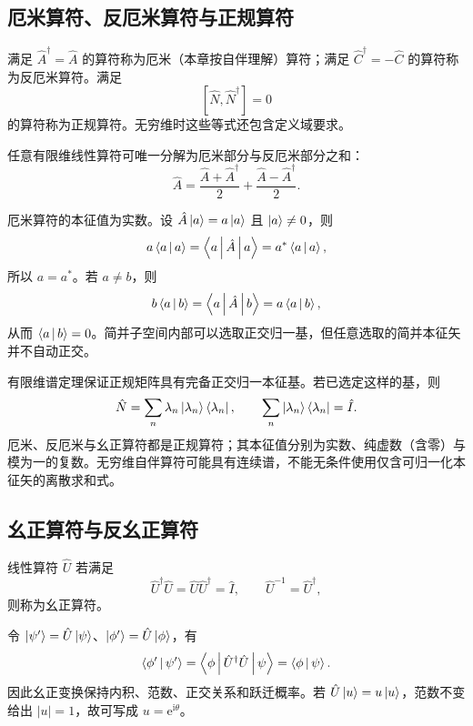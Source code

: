 \subsection{厄米算符、反厄米算符与正规算符}
\begin{definition}
满足 $\hat A^\dagger=\hat A$ 的算符称为厄米（本章按自伴理解）算符；满足 $\hat C^\dagger=-\hat C$ 的算符称为反厄米算符。满足
\begin{equation}
\left[\hat N,\hat N^\dagger\right]=0
\end{equation}
的算符称为正规算符。无穷维时这些等式还包含定义域要求。
\end{definition}
任意有限维线性算符可唯一分解为厄米部分与反厄米部分之和：
\begin{equation}
\hat A=\frac{\hat A+\hat A^\dagger}{2}
+\frac{\hat A-\hat A^\dagger}{2}.
\end{equation}

厄米算符的本征值为实数。设 $\hat A\Ket{a}=a\Ket{a}$ 且 $\Ket{a}\neq0$，则
\begin{equation}
a\Braket{a|a}=\Braket{a|\hat A|a}=a^*\Braket{a|a},
\end{equation}
所以 $a=a^*$。若 $a\neq b$，则
\begin{equation}
b\Braket{a|b}=\Braket{a|\hat A|b}=a\Braket{a|b},
\end{equation}
从而 $\Braket{a|b}=0$。简并子空间内部可以选取正交归一基，但任意选取的简并本征矢并不自动正交。

有限维谱定理保证正规矩阵具有完备正交归一本征基。若已选定这样的基，则
\begin{equation}
\hat N=\sum_n\lambda_n\Ket{\lambda_n}\Bra{\lambda_n},\qquad
\sum_n\Ket{\lambda_n}\Bra{\lambda_n}=\hat I.
\end{equation}
厄米、反厄米与幺正算符都是正规算符；其本征值分别为实数、纯虚数（含零）与模为一的复数。无穷维自伴算符可能具有连续谱，不能无条件使用仅含可归一化本征矢的离散求和式。

\subsection{幺正算符与反幺正算符}
\begin{definition}
线性算符 $\hat U$ 若满足
\begin{equation}
\hat U^\dagger\hat U=\hat U\hat U^\dagger=\hat I,
\qquad\hat U^{-1}=\hat U^\dagger,
\end{equation}
则称为幺正算符。
\end{definition}
令 $\Ket{\psi'}=\hat U\Ket{\psi}$、$\Ket{\phi'}=\hat U\Ket{\phi}$，有
\begin{equation}
\Braket{\phi'|\psi'}=\Braket{\phi|\hat U^\dagger\hat U|\psi}
=\Braket{\phi|\psi}.
\end{equation}
因此幺正变换保持内积、范数、正交关系和跃迁概率。若
$\hat U\Ket{u}=u\Ket{u}$，范数不变给出 $\left|u\right|=1$，故可写成 $u=\mathrm{e}^{\mathrm{i}\theta}$。

